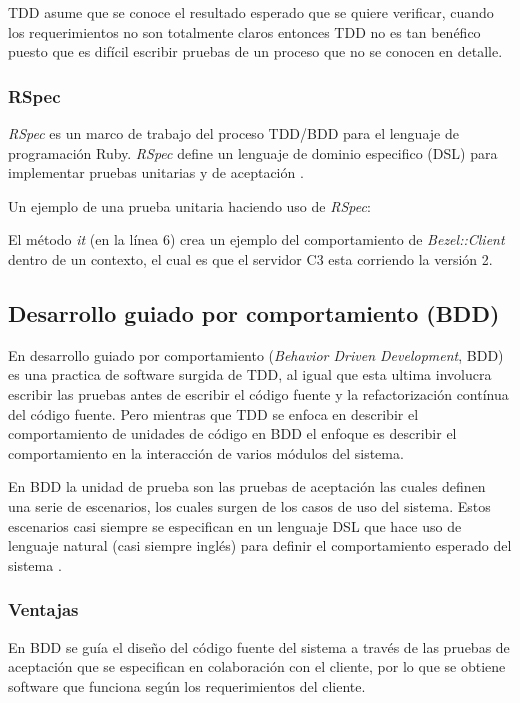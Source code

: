 TDD asume que se conoce el resultado esperado que se quiere verificar,
cuando los requerimientos no son totalmente claros entonces TDD no es tan benéfico
puesto que es difícil escribir pruebas de un proceso que no se conocen en detalle.

\subsubsection{RSpec}
\textit{RSpec} es un marco de trabajo del proceso TDD/BDD para el lenguaje de
programación Ruby. \textit{RSpec} define un lenguaje de dominio especifico (DSL)
para implementar pruebas unitarias y de aceptación \cite{23_chelimsky_2010}.

\vspace{2.5mm}

Un ejemplo de una prueba unitaria haciendo uso de \textit{RSpec}:


El método \textit{it} (en la línea 6) crea un ejemplo del comportamiento de
\textit{Bezel::Client} dentro de un contexto, el cual es que el servidor C3
esta corriendo la versión 2.

\subsection{Desarrollo guiado por comportamiento (BDD)}
En desarrollo guiado por comportamiento (\textit{Behavior Driven Development}, BDD)
es una practica de software surgida de TDD, al igual que esta ultima
involucra escribir las pruebas antes de escribir el código fuente y la
refactorización contínua del código fuente. Pero mientras que TDD se enfoca
en describir el comportamiento de unidades de código en BDD el enfoque es
describir el comportamiento en la interacción de varios módulos del sistema.

En BDD la unidad de prueba son las pruebas de aceptación las cuales definen
una serie de escenarios, los cuales surgen de los casos de uso del sistema.
Estos escenarios casi siempre se especifican en un lenguaje DSL que hace uso
de lenguaje natural (casi siempre inglés) para definir el comportamiento
esperado del sistema \cite{23_chelimsky_2010}.

\subsubsection{Ventajas}
En BDD se guía el diseño del código fuente del sistema a través de las pruebas
de aceptación que se especifican en colaboración con el cliente, por lo que
se obtiene software que funciona según los requerimientos del cliente.

